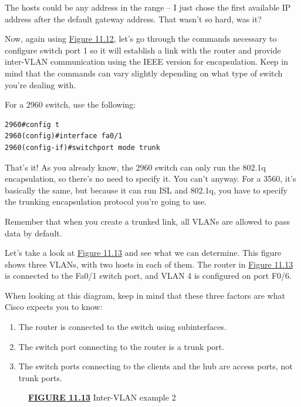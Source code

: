 The hosts could be any address in the range -- I just chose the first
available IP address after the default gateway address. That wasn't so
hard, was it?

Now, again using \protect\hyperlink{c11.xhtmlux5cux23figure11-12}{Figure
11.12}, let's go through the commands necessary to configure switch port
1 so it will establish a link with the router and provide inter-VLAN
communication using the IEEE version for encapsulation. Keep in mind
that the commands can vary slightly depending on what type of switch
you're dealing with.

For a 2960 switch, use the following:

\begin{verbatim}
2960#config t
2960(config)#interface fa0/1
2960(config-if)#switchport mode trunk
\end{verbatim}

That's it! As you
already know, the 2960 switch can only run the 802.1q encapsulation, so
there's no need to specify it. You can't anyway. For a 3560, it's
basically the same, but because it can run ISL and 802.1q, you have to
specify the trunking encapsulation protocol you're going to use.

\begin{note}
Remember that when you create a trunked link, all VLANs are allowed to pass data by default.
\end{note}

Let's take a look at
\protect\hyperlink{c11.xhtmlux5cux23figure11-13}{Figure 11.13} and see
what we can determine. This figure shows three VLANs, with two hosts in
each of them. The router in
\protect\hyperlink{c11.xhtmlux5cux23figure11-13}{Figure 11.13} is
connected to the Fa0/1 switch port, and VLAN 4 is configured on port
F0/6.

When looking at this diagram, keep in mind that these three factors are what Cisco expects you to know:

\begin{enumerate}
\tightlist
\item
  The router is connected to the switch using subinterfaces.
\item
  The switch port connecting to the router is a trunk port.
\item
  The switch ports connecting to the clients and the hub are access
  ports, not trunk ports.
\end{enumerate}

\begin{figure}
\centering
\caption{{\protect\hyperlink{c11.xhtmlux5cux23figureanchor11-13}{\textbf{FIGURE
11.13}} Inter-VLAN example 2}}
\end{figure}

